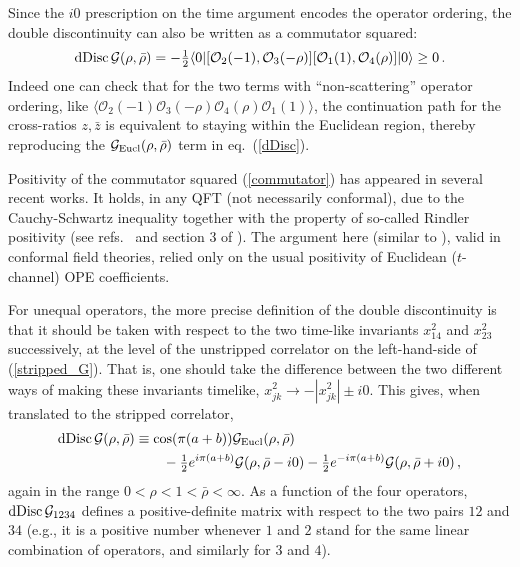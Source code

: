 \documentclass[11pt, reqno,preprint]{article}
\def\be{\begin{equation}}
\def\ee{\end{equation}}
\def\dDisc{{\rm dDisc}\,}
\def\OO{\mathcal{O}}
\def\rhobar{\bar{\rho}}
\def\zbar{\bar{z}}
\def\GG{\mathcal{G}}
\begin{document}
Since the $i0$ prescription on the time argument
encodes the operator ordering, the double discontinuity can also be written as a commutator squared:
\be
\dDisc \GG(\rho,\rhobar) =  -\tfrac12\langle0| [\OO_2(-1),\OO_3(-\rho)][\OO_1(1),\OO_4(\rho)]|0\rangle \geq 0\,. \label{commutator}
\ee
Indeed one can check that for the two terms with ``non-scattering'' operator ordering, like
$\langle \OO_2(-1)\OO_3(-\rho)\OO_4(\rho)\OO_1(1)\rangle$, the continuation path for the cross-ratios $z,\zbar$ is equivalent
to staying within the Euclidean region, thereby reproducing the $\GG_{\rm Eucl}(\rho,\rhobar)$ term in eq.~(\ref{dDisc}).

Positivity of the commutator squared (\ref{commutator}) has appeared in several recent works.
It holds, in any QFT (not necessarily conformal), due to the Cauchy-Schwartz inequality
together with the property of so-called Rindler positivity (see refs.~\cite{Maldacena:2015waa,Hartman:2016lgu} and section 3 of \cite{Casini:2010bf}).
The argument here (similar to \cite{Hartman:2015lfa,Maldacena:2015iua}), valid in conformal field theories,
relied only on the usual positivity of Euclidean ($t$-channel) OPE coefficients.

For unequal operators, the more precise definition of the double discontinuity
is that it should be taken with respect to the
two time-like invariants $x_{14}^2$ and $x_{23}^2$ successively, at the level of the unstripped correlator on the left-hand-side of (\ref{stripped_G}).
That is, one should take the difference between the two different ways of making these invariants timelike,
$x_{jk}^2\to -|x_{jk}^2|\pm i0$.
This gives, when translated to the stripped correlator,
\be\begin{aligned}
 \dDisc \GG(\rho,\rhobar) &\equiv \cos(\pi(a+b)) \GG_{\rm Eucl}(\rho,\rhobar) 
\\& \qquad-\tfrac12e^{i\pi(a+b)} \GG(\rho,\rhobar-i0)
 -\tfrac12 e^{-i\pi(a+b)} \GG(\rho,\rhobar+i0)\,,
\label{dDisc_full}
\end{aligned}\ee
again in the range $0{<}\rho{<}1{<}\rhobar{<}\infty$.
As a function of the four operators, $ \dDisc \GG_{1234}$ defines a positive-definite matrix
with respect to the two pairs $12$ and $34$ (e.g., it is a positive number whenever $1$ and $2$ stand for
the same linear combination of operators, and similarly for $3$ and $4$).
\end{document}
